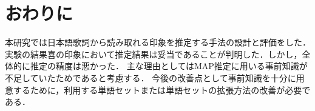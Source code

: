 \documentclass[a4paper,10pt,twocolumn]{jsarticle}
\begin{document}
\section{おわりに}
本研究では日本語歌詞から読み取れる印象を推定する手法の設計と評価をした．
実験の結果喜の印象において推定結果は妥当であることが判明した．しかし，全体的に推定の精度は悪かった．
主な理由としてはMAP推定に用いる事前知識が不足していたためであると考慮する．
今後の改善点として事前知識を十分に用意するために，利用する単語セットまたは単語セットの拡張方法の改善が必要である．
%
\end{document}
